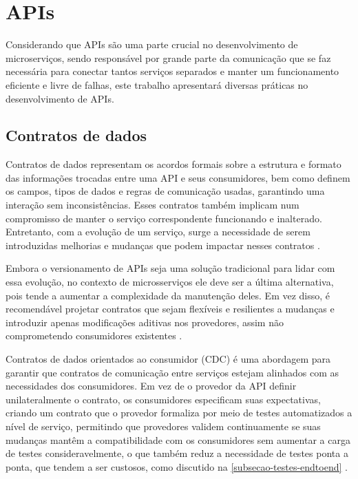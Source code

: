 
\section{APIs}\label{boas-praticas-apis}

Considerando que APIs são uma parte crucial no desenvolvimento de microserviços, sendo responsável por grande parte da comunicação que se faz necessária para conectar tantos serviços separados e manter um funcionamento eficiente e livre de falhas, este trabalho apresentará diversas práticas no desenvolvimento de APIs.

\subsection{Contratos de dados}\label{subsecao-contratos-de-dados}
Contratos de dados representam os acordos formais sobre a estrutura e formato das informações trocadas entre uma API e seus consumidores, bem como definem os campos, tipos de dados e regras de comunicação usadas, garantindo uma interação sem inconsistências. Esses contratos também implicam num compromisso de manter o serviço correspondente funcionando e inalterado. Entretanto, com a evolução de um serviço, surge a necessidade de serem introduzidas melhorias e mudanças que podem impactar nesses contratos \cite{martin-fowler-microservices}.

Embora o versionamento de APIs seja uma solução tradicional para lidar com essa evolução, no contexto de microsserviços ele deve ser a última alternativa, pois tende a aumentar a complexidade da manutenção deles. Em vez disso, é recomendável projetar contratos que sejam flexíveis e resilientes a mudanças e introduzir apenas modificações aditivas nos provedores, assim não comprometendo consumidores existentes \cite{martin-fowler-microservices}.

Contratos de dados orientados ao consumidor (CDC) é uma abordagem para garantir que contratos de comunicação entre serviços estejam alinhados com as necessidades dos consumidores. Em vez de o provedor da API definir unilateralmente o contrato, os consumidores especificam suas expectativas, criando um contrato que o provedor formaliza por meio de testes automatizados a nível de serviço, permitindo que provedores validem continuamente se suas mudanças mantêm a compatibilidade com os consumidores sem aumentar a carga de testes consideravelmente, o que também reduz a necessidade de testes ponta a ponta, que tendem a ser custosos, como discutido na \autoref{subsecao-testes-endtoend} \cite{consumer-driven-contracts,livro-building-microservices}.

